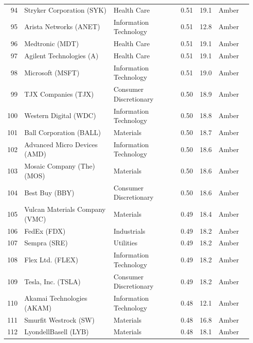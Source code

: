 \documentclass[11pt,a4paper]{article}
\begin{document}
{\begin{longtable}{r p{4.4cm} p{2.8cm} r r l l}
94 & Stryker Corporation (SYK) & Health Care & 0.51 & 19.1 & \cellcolor[HTML]{FFEB9C}Amber &  \\
95 & Arista Networks (ANET) & Information Technology & 0.51 & 12.8 & \cellcolor[HTML]{FFEB9C}Amber &  \\
96 & Medtronic (MDT) & Health Care & 0.51 & 19.1 & \cellcolor[HTML]{FFEB9C}Amber &  \\
97 & Agilent Technologies (A) & Health Care & 0.51 & 19.1 & \cellcolor[HTML]{FFEB9C}Amber &  \\
98 & Microsoft (MSFT) & Information Technology & 0.51 & 19.0 & \cellcolor[HTML]{FFEB9C}Amber &  \\
99 & TJX Companies (TJX) & Consumer Discretionary & 0.50 & 18.9 & \cellcolor[HTML]{FFEB9C}Amber &  \\
100 & Western Digital (WDC) & Information Technology & 0.50 & 18.8 & \cellcolor[HTML]{FFEB9C}Amber &  \\
101 & Ball Corporation (BALL) & Materials & 0.50 & 18.7 & \cellcolor[HTML]{FFEB9C}Amber &  \\
102 & Advanced Micro Devices (AMD) & Information Technology & 0.50 & 18.6 & \cellcolor[HTML]{FFEB9C}Amber &  \\
103 & Mosaic Company (The) (MOS) & Materials & 0.50 & 18.6 & \cellcolor[HTML]{FFEB9C}Amber &  \\
104 & Best Buy (BBY) & Consumer Discretionary & 0.50 & 18.6 & \cellcolor[HTML]{FFEB9C}Amber &  \\
105 & Vulcan Materials Company (VMC) & Materials & 0.49 & 18.4 & \cellcolor[HTML]{FFEB9C}Amber &  \\
106 & FedEx (FDX) & Industrials & 0.49 & 18.2 & \cellcolor[HTML]{FFEB9C}Amber &  \\
107 & Sempra (SRE) & Utilities & 0.49 & 18.2 & \cellcolor[HTML]{FFEB9C}Amber &  \\
108 & Flex Ltd. (FLEX) & Information Technology & 0.49 & 18.2 & \cellcolor[HTML]{FFEB9C}Amber &  \\
109 & Tesla, Inc. (TSLA) & Consumer Discretionary & 0.49 & 18.2 & \cellcolor[HTML]{FFEB9C}Amber &  \\
110 & Akamai Technologies (AKAM) & Information Technology & 0.48 & 12.1 & \cellcolor[HTML]{FFEB9C}Amber &  \\
111 & Smurfit Westrock (SW) & Materials & 0.48 & 16.8 & \cellcolor[HTML]{FFEB9C}Amber &  \\
112 & LyondellBasell (LYB) & Materials & 0.48 & 18.1 & \cellcolor[HTML]{FFEB9C}Amber &  \\

\end{longtable}}
\end{document}
